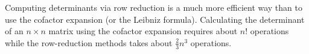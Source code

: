 \documentclass{ximera}
\begin{document}
\begin{remark}
  Computing determinants via row reduction is a much more efficient
  way than to use the cofactor expansion (or the Leibniz
  formula). Calculating the determinant of an $n \times n$ matrix using the
  cofactor expansion requires about $n!$ operations while the
  row-reduction methods takes about $\frac{2}{3} n^3$ operations.
\end{remark}



\end{document}
